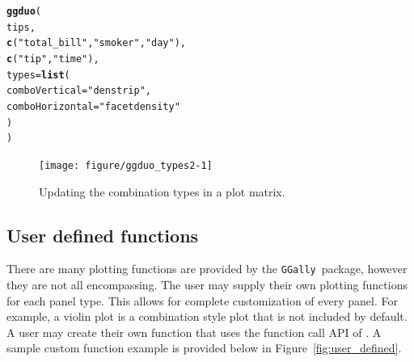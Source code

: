 \documentclass[stat,dissertation]{puthesis}\usepackage[]{graphicx}\usepackage{xcolor}
\makeatletter
\newcommand{\hlstr}[1]{\textcolor[rgb]{0.192,0.494,0.8}{#1}}%
\newcommand{\hlstd}[1]{\textcolor[rgb]{0.345,0.345,0.345}{#1}}%
\newcommand{\hlkwc}[1]{\textcolor[rgb]{0.333,0.667,0.333}{#1}}%
\newcommand{\hlkwd}[1]{\textcolor[rgb]{0.737,0.353,0.396}{\textbf{#1}}}%
\newenvironment{kframe}{%
 \def\at@end@of@kframe{}%
 \ifinner\ifhmode%
  \def\at@end@of@kframe{\end{minipage}}%
  \begin{minipage}{\columnwidth}%
 \fi\fi%
 \def\FrameCommand##1{\hskip\@totalleftmargin \hskip-\fboxsep
 \colorbox{shadecolor}{##1}\hskip-\fboxsep
     \hskip-\linewidth \hskip-\@totalleftmargin \hskip\columnwidth}%
 \MakeFramed {\advance\hsize-\width
   \@totalleftmargin\z@ \linewidth\hsize
   \@setminipage}}%
 {\par\unskip\endMakeFramed%
 \at@end@of@kframe}
\newenvironment{knitrout}{}{} %
\renewenvironment{knitrout}{\setstretch{1}}{}
\newcommand{\pkg}[1]{\texttt{#1}}
\newcommand{\GGally}{\pkg{GGally}}
\makeatother
\begin{document}
\newpage
\begin{knitrout}\small
{}\color{fgcolor}\begin{kframe}
\begin{alltt}
\hlkwd{ggduo}\hlstd{(}
  \hlstd{tips,}
  \hlkwd{c}\hlstd{(}\hlstr{"total_bill"}\hlstd{,} \hlstr{"smoker"}\hlstd{,} \hlstr{"day"}\hlstd{),}
  \hlkwd{c}\hlstd{(}\hlstr{"tip"}\hlstd{,} \hlstr{"time"}\hlstd{),}
  \hlkwc{types} \hlstd{=} \hlkwd{list}\hlstd{(}
    \hlkwc{comboVertical} \hlstd{=} \hlstr{"denstrip"}\hlstd{,}
    \hlkwc{comboHorizontal} \hlstd{=} \hlstr{"facetdensity"}
  \hlstd{)}
\hlstd{)}
\end{alltt}
\end{kframe}\begin{figure}[H]

{\centering \texttt{[image: figure/ggduo\_types2-1]} 

}

\caption{Updating the combination types in a  plot matrix.}\label{fig:ggduo_types2}
\end{figure}


\end{knitrout}


\subsection{User defined functions}

There are many plotting functions are provided by the \GGally~package, however they are not all encompassing.  The user may supply their own plotting functions for each panel type.  This allows for complete customization of every panel. For example, a violin plot is a combination style plot that is not included by default.  A user may create their own function that uses the function call API of .  A sample custom function example is provided below in Figure~\ref{fig:user_defined}.
\end{document}
